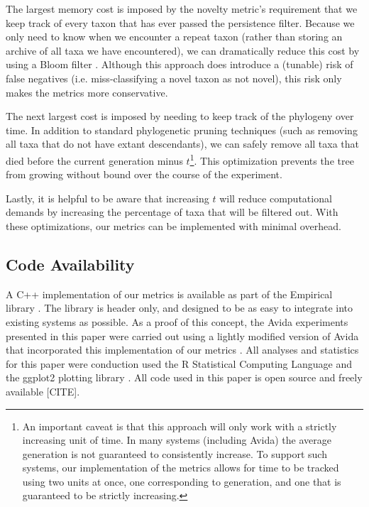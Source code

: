 \documentclass[letterpaper]{article}
\begin{document}
The largest memory cost is imposed by the novelty metric's requirement that we keep track of every taxon that has ever passed the persistence filter. Because we only need to know when we encounter a repeat taxon (rather than storing an archive of all taxa we have encountered), we can dramatically reduce this cost by using a Bloom filter \citep{Bloom:1970:STH:362686.362692}. Although this approach does introduce a (tunable) risk of false negatives (i.e. miss-classifying a novel taxon as not novel), this risk only makes the metrics more conservative. 

The next largest cost is imposed by needing to keep track of the phylogeny over time. In addition to standard phylogenetic pruning techniques (such as removing all taxa that do not have extant descendants), we can safely remove all taxa that died before the current generation minus $t$\footnote{An important caveat is that this approach will only work with a strictly increasing unit of time. In many systems (including Avida) the average generation is not guaranteed to consistently increase. To support such systems, our implementation of the metrics allows for time to be tracked using two units at once, one corresponding to generation, and one that is guaranteed to be strictly increasing.}. This optimization prevents the tree from growing without bound over the course of the experiment.

Lastly, it is helpful to be aware that increasing $t$ will reduce computational demands by increasing the percentage of taxa that will be filtered out. With these optimizations, our metrics can be implemented with minimal overhead.

\subsection{Code Availability}
A C++ implementation of our metrics is available as part of the Empirical library \citep{charles_ofria_2018_1439475}. The library is header only, and designed to be as easy to integrate into existing systems as possible. As a proof of this concept, the Avida experiments presented in this paper were carried out using a lightly modified version of Avida that incorporated this implementation of our metrics \citep{david_bryson_2018_1439479}. All analyses and statistics for this paper were conduction used the R Statistical Computing Language \citep{r_core_team_r:_2017} and the ggplot2 plotting library \citep{wickham_ggplot2_2016}. All code used in this paper is open source and freely available [CITE].
\end{document}
